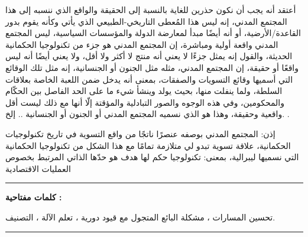\begin{Arabic}أعتقد أنه يجب أن نكون حذرين للغاية بالنسبة إلى الحقيقة والواقع الذي ننسبه إلى هذا المجتمع المدني، إنه ليس هذا المُعطى التاريخي-الطبيعي الذي يأتي وكأنه يقوم بدور القاعدة/الأرضية، أو أنه أيضًا مبدأ لمعارضة الدولة والمؤسسات السياسية، ليس المجتمع المدني واقعة أولية ومباشرة، إن المجتمع المدني هو جزء من تكنولوجيا الحكمانية الحديثة، والقول إنه يمثل جزءًا لا يعني أنه منتج لا أكثر ولا أقل، ولا يعني أيضًا أنه ليس واقعًا أو حقيقة، إن المجتمع المدني، مثله مثل الجنون أو الجنسانية، إنه مثل تلك الوقائع التي أسميها وقائع التسويات والصفقات، بمعنى أنه يدخل ضمن اللعبة الخاصة بعلاقات السلطة، ولما ينفلت منها، بحيث يولد وينشأ شيء ما على الحد الفاصل بين الحكّام والمحكومين، وفي هذه الوجوه والصور التبادلية والمؤقتة إلّا أنها مع ذلك ليست أقل واقعية وحقيقة، وهذا هو الذي نسميه المجتمع المدني أو الجنون أو الجنسانية .. إلخ. .
\end{Arabic}

\medskip

\begin{Arabic}
إذن: المجتمع المدني بوصفه عنصرًا ناتجًا من واقع التسوية في تاريخ تكنولوجيات الحكمانية، علاقة تسوية تبدو لي متلازمة تمامًا مع هذا الشكل من تكنولوجيا الحكمانية التي نسميها ليبرالية، بمعنى: تكنولوجيا حكم لها هدف هو حدّها الذاتي المرتبط بخصوص العمليات الاقتصادية
\end{Arabic}

\medskip

\vspace{3cm}

\noindent\rule[2pt]{\textwidth}{0.5pt}


\begin{Arabic}
\textbf{كلمات مفتاحية :}

تحسين المسارات ، مشكلة البائع المتجول مع قيود دورية ، تعلم الآلة ، التصنيف.

\end{Arabic}

\noindent\rule[2pt]{\textwidth}{0.5pt}

